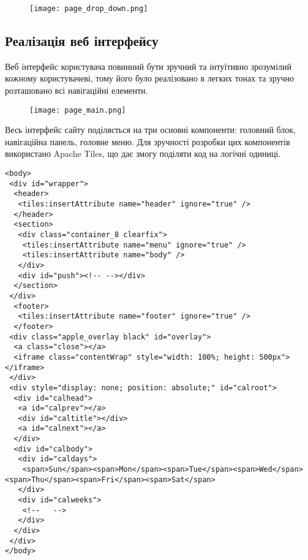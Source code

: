 \begin{figure}[!ht]
\centering
    \texttt{[image: page\_drop\_down.png]}
    \vspace{18pt}
    \label{pic:page_drop_down}
\end{figure}


\subsection{Реалізація веб інтерфейсу}
\par Веб інтерфейс користувача повинний бути зручний та інтуїтивно зрозумілий кожному користувачеві, тому його було реалізовано в легких тонах та зручно розташовано всі навігаційні елементи.

\begin{figure}[!ht]
\centering
		\texttt{[image: page\_main.png]}
    \vspace{18pt}
		\label{pic:page_main}
\end{figure}
\par Весь інтерфейс сайту поділяється на три основні компоненти: головний блок, навігаційна панель, головне меню. Для зручності розробки цих компонентів використано Apache Tiles, що дає змогу поділяти код на логічні одиниці.
\begin{lstlisting}
<body>
 <div id="wrapper">
  <header>
   <tiles:insertAttribute name="header" ignore="true" />
  </header>
  <section>
   <div class="container_8 clearfix">
    <tiles:insertAttribute name="menu" ignore="true" />
    <tiles:insertAttribute name="body" />
   </div>
   <div id="push"><!-- --></div>
  </section>
 </div>
  <footer>
   <tiles:insertAttribute name="footer" ignore="true" />
  </footer>
 <div class="apple_overlay black" id="overlay">
  <a class="close"></a>
  <iframe class="contentWrap" style="width: 100%; height: 500px"></iframe>
 </div>
 <div style="display: none; position: absolute;" id="calroot">
  <div id="calhead">
   <a id="calprev"></a>
   <div id="caltitle"></div>
   <a id="calnext"></a>
  </div>
  <div id="calbody">
   <div id="caldays">
    <span>Sun</span><span>Mon</span><span>Tue</span><span>Wed</span><span>Thu</span><span>Fri</span><span>Sat</span>
   </div>
   <div id="calweeks">
    <!--   -->
   </div>
  </div>
 </div>
</body>
\end{lstlisting}



